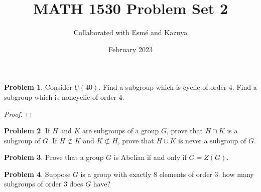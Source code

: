 \documentclass[12pt,reqno]{article}
\title{MATH 1530 Problem Set 2}
\author{Collaborated with Esmé and Kazuya}
\date{February 2023}
\theoremstyle{plain}
\theoremstyle{definition}
\newtheorem{problem}{Problem}
\begin{document}
\maketitle


\begin{problem} 
    Consider $U(40)$. Find a subgroup which is cyclic of order 4. Find a subgroup which is noncyclic of order 4. 
\end{problem}
\begin{proof}
    
\end{proof}

\newpage


\begin{problem}
    If $H$ and $K$ are subgroups of a group $G$, prove that $H \cap K$ is a subgroup of $G$. If $H \not \subset K$ and $K \not \subset H$, prove that $H \cup K$ is never a subgroup of $G$.
\end{problem}

\newpage


\begin{problem} 
    Prove that a group $G$ is Abelian if and only if $G = Z(G)$.
\end{problem}

\newpage


\begin{problem} 
    Suppose $G$ is a group with exactly 8 elements of order $3$. how many subgroups of order $3$ does $G$ have?
\end{problem}
\end{document}

